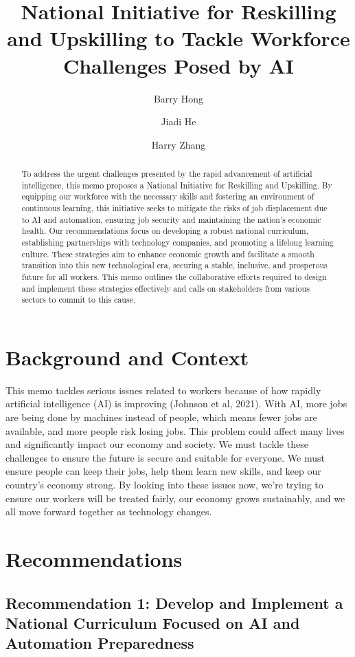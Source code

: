 \documentclass[11pt]{article}
\title{National Initiative for Reskilling and Upskilling to Tackle Workforce Challenges Posed by AI}
\author{Barry Hong}
\author{Jiadi He}
\author{Harry Zhang}
\affil{Harvard University}
\begin{document}
\maketitle

\begin{abstract}
To address the urgent challenges presented by the rapid advancement of artificial intelligence, this memo proposes a National Initiative for Reskilling and Upskilling. By equipping our workforce with the necessary skills and fostering an environment of continuous learning, this initiative seeks to mitigate the risks of job displacement due to AI and automation, ensuring job security and maintaining the nation's economic health. Our recommendations focus on developing a robust national curriculum, establishing partnerships with technology companies, and promoting a lifelong learning culture. These strategies aim to enhance economic growth and facilitate a smooth transition into this new technological era, securing a stable, inclusive, and prosperous future for all workers. This memo outlines the collaborative efforts required to design and implement these strategies effectively and calls on stakeholders from various sectors to commit to this cause.
\end{abstract}

\section{Background and Context}

This memo tackles serious issues related to workers because of how rapidly artificial intelligence (AI) is improving (Johnson et al, 2021). With AI, more jobs are being done by machines instead of people, which means fewer jobs are available, and more people risk losing jobs. This problem could affect many lives and significantly impact our economy and society. We must tackle these challenges to ensure the future is secure and suitable for everyone. We must ensure people can keep their jobs, help them learn new skills, and keep our country's economy strong. By looking into these issues now, we’re trying to ensure our workers will be treated fairly, our economy grows sustainably, and we all move forward together as technology changes.

\section{Recommendations}

\subsection{Recommendation 1: Develop and Implement a National Curriculum Focused on AI and Automation Preparedness}
\end{document}
